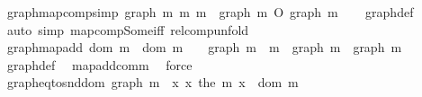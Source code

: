 \begin{isabellebody}
\ graph{\isacharunderscore}{\kern0pt}map{\isacharunderscore}{\kern0pt}comp{\isacharbrackleft}{\kern0pt}simp{\isacharbrackright}{\kern0pt}{\isacharcolon}{\kern0pt}\ {\isachardoublequoteopen}graph\ {\isacharparenleft}{\kern0pt}m{}\ {\isasymcirc}\isactrlsub m\ m{}{\isacharparenright}{\kern0pt}\ {\isacharequal}{\kern0pt}\ graph\ m{}\ O\ graph\ m{}{\isachardoublequoteclose}\isanewline
%
\isadelimproof
\ \ %
\endisadelimproof
%
\isatagproof
{}\isamarkupfalse%
\ graph{\isacharunderscore}{\kern0pt}def\ \isamarkupfalse%
\ {\isacharparenleft}{\kern0pt}auto\ simp{\isacharcolon}{\kern0pt}\ map{\isacharunderscore}{\kern0pt}comp{\isacharunderscore}{\kern0pt}Some{\isacharunderscore}{\kern0pt}iff\ relcomp{\isacharunderscore}{\kern0pt}unfold{\isacharparenright}{\kern0pt}%
\endisatagproof
{\isafoldproof}%
%
\isadelimproof
\isanewline
%
\endisadelimproof
\isanewline
{}\isamarkupfalse%
\ graph{\isacharunderscore}{\kern0pt}map{\isacharunderscore}{\kern0pt}add{\isacharcolon}{\kern0pt}\ {\isachardoublequoteopen}dom\ m{}\ {\isasyminter}\ dom\ m{}\ {\isacharequal}{\kern0pt}\ {\isacharbraceleft}{\kern0pt}{\isacharbraceright}{\kern0pt}\ {\isasymLongrightarrow}\ graph\ {\isacharparenleft}{\kern0pt}m{}\ {\isacharplus}{\kern0pt}{\isacharplus}{\kern0pt}\ m{}{\isacharparenright}{\kern0pt}\ {\isacharequal}{\kern0pt}\ graph\ m{}\ {\isasymunion}\ graph\ m{}{\isachardoublequoteclose}\isanewline
%
\isadelimproof
\ \ %
\endisadelimproof
%
\isatagproof
{}\isamarkupfalse%
\ graph{\isacharunderscore}{\kern0pt}def\ \isamarkupfalse%
\ map{\isacharunderscore}{\kern0pt}add{\isacharunderscore}{\kern0pt}comm\ \isamarkupfalse%
\ force%
\endisatagproof
{\isafoldproof}%
%
\isadelimproof
\isanewline
%
\endisadelimproof
\isanewline
{}\isamarkupfalse%
\ graph{\isacharunderscore}{\kern0pt}eq{\isacharunderscore}{\kern0pt}to{\isacharunderscore}{\kern0pt}snd{\isacharunderscore}{\kern0pt}dom{\isacharcolon}{\kern0pt}\ {\isachardoublequoteopen}graph\ m\ {\isacharequal}{\kern0pt}\ {\isacharparenleft}{\kern0pt}{\isasymlambda}x{\isachardot}{\kern0pt}\ {\isacharparenleft}{\kern0pt}x{\isacharcomma}{\kern0pt}\ the\ {\isacharparenleft}{\kern0pt}m\ x{\isacharparenright}{\kern0pt}{\isacharparenright}{\kern0pt}{\isacharparenright}{\kern0pt}\ {\isacharbackquote}{\kern0pt}\ dom\ m{\isachardoublequoteclose}\isanewline
%
\isadelimproof
\ \ %
\endisadelimproof
%
\isatagproof
{}\isamarkupfalse%

\end{isabellebody}
